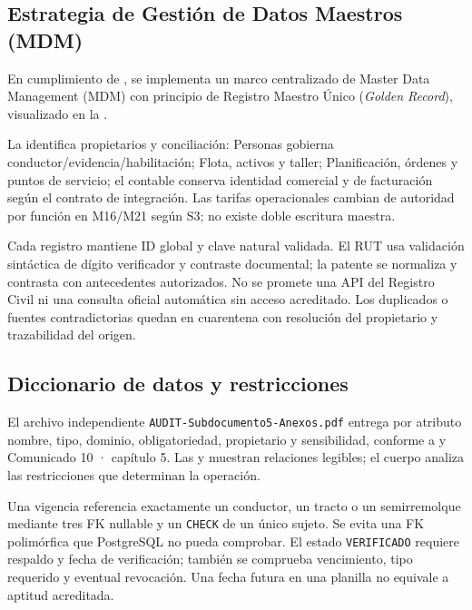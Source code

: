 \FloatBarrier
\subsection{Estrategia de Gestión de Datos Maestros (MDM)}\label{sec:5-mdm}\label{sec:05-estrategia-de-gestion-de-datos-maestros-mdm}

En cumplimiento de , se implementa un marco centralizado de Master Data Management (MDM) con principio de Registro Maestro Único (\emph{Golden Record}), visualizado en la .


La  identifica propietarios y conciliación: Personas gobierna conductor/evidencia/habilitación; Flota, activos y taller; Planificación, órdenes y puntos de servicio; el contable conserva identidad comercial y de facturación según el contrato de integración. Las tarifas operacionales cambian de autoridad por función en M16/M21 según S3; no existe doble escritura maestra.

Cada registro mantiene ID global y clave natural validada. El RUT usa validación sintáctica de dígito verificador y contraste documental; la patente se normaliza y contrasta con antecedentes autorizados. No se promete una API del Registro Civil ni una consulta oficial automática sin acceso acreditado. Los duplicados o fuentes contradictorias quedan en cuarentena con resolución del propietario y trazabilidad del origen.

\FloatBarrier
\subsection{Diccionario de datos y restricciones}\label{sec:5-diccionario}\label{sec:05-diccionario-de-datos-y-restricciones}

El archivo independiente \texttt{AUDIT-Subdocumento5-Anexos.pdf} entrega por atributo nombre, tipo, dominio, obligatoriedad, propietario y sensibilidad, conforme a  y Comunicado 10 · capítulo 5. Las  y  muestran relaciones legibles; el cuerpo analiza las restricciones que determinan la operación.

Una vigencia referencia exactamente un conductor, un tracto o un semirremolque mediante tres FK nullable y un \texttt{CHECK} de un único sujeto. Se evita una FK polimórfica que PostgreSQL no pueda comprobar. El estado \texttt{VERIFICADO} requiere respaldo y fecha de verificación; también se comprueba vencimiento, tipo requerido y eventual revocación. Una fecha futura en una planilla no equivale a aptitud acreditada.

